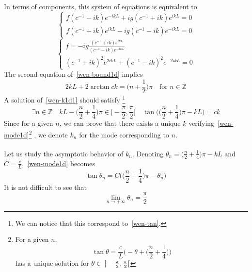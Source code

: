 In terms of components, this system of equations is equivalent to
\begin{equation*}
\begin{cases}
f(c^{-1} - ik)e^{-ikL} + ig(c^{-1} + ik)e^{ikL} = 0 \\
f(c^{-1} + ik)e^{ikL} - ig(c^{-1}- ik) e^{-ikL} = 0
\end{cases}
\end{equation*}
\ie
\begin{equation}\label{wen-bound1d}
\begin{cases}
f = -ig \frac{(c^{-1} + ik)e^{ikL}}{(c^{-1} - ik) e^{-ikL}} \\
%
(c^{-1} + ik)^2 e^{2ikL} + (c^{-1}-ik)^2 e^{-2ikL} = 0
\end{cases}
\end{equation}
The second equation of~\cref{wen-bound1d} implies
\begin{equation}\label{wen-k1d1}
2kL + 2\arctan{ck} = \big( n +\frac 1 2 \big) \pi \quad\textrm{for $n \in \mathbb Z$}
\end{equation}
A solution of~\cref{wen-k1d1} should satisfy
\footnote{We can notice that this correspond to~\cref{wen-tan}.}
\begin{equation}\label{wen-mode1d}
\exists n\in \mathbb{Z}\quad
kL - \big(\frac{n}{2} + \frac 1 4 \big) \pi \in \big[-\frac{\pi}{2}, \frac{\pi}{2}\big] \quad
\tan\Big( \big(\frac{n}{2}+\frac 1 4 \big)\pi -kL \Big) = ck
\end{equation}
Since for a given $n$, we can prove that there exists a unique $k$ verifying~\cref{wen-mode1d}\footnote{
For a given $n$, 
\begin{equation*}
\tan \theta = \frac c L \Big( -\theta + \big( \frac n 2 + \frac 1 4 \big)\Big)
\end{equation*}
has a unique solution for $\theta \in \enskip] -\frac{\pi}{2}, \frac{\pi}{2}[$
}
, we denote $k_n$ for the mode corresponding to $n$. \\\\
Let us study the asymptotic behavior of $k_n$. 
Denoting $\theta_n = \big( \frac n 2 + \frac 1 4 \big)\pi - kL$ and $C = \frac c L$,~\cref{wen-mode1d} becomes
\begin{equation}\label{wen-modetheta}
\tan \theta_n = C \Big( \big(\frac n 2 +\frac 1 4 \big)\pi - \theta_n \Big)
\end{equation} 
It is not difficult to see that 
\begin{equation*}
\lim_{n\rightarrow+\infty}\theta_n = \frac \pi 2
\end{equation*}
